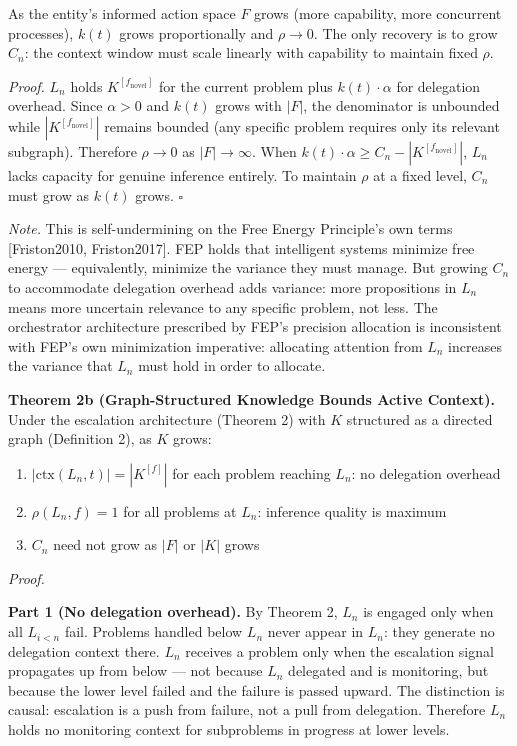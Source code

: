 \documentclass[
]{article}
\providecommand{\tightlist}{%
  \setlength{\itemsep}{0pt}\setlength{\parskip}{0pt}}
\begin{document}
As the entity's informed action space \(F\) grows (more capability, more
concurrent processes), \(k(t)\) grows proportionally and \(\rho \to 0\).
The only recovery is to grow \(C_n\): the context window must scale
linearly with capability to maintain fixed \(\rho\).

\emph{Proof.} \(L_n\) holds \(K^{[f_{\text{novel}}]}\) for the current
problem plus \(k(t)\cdot\alpha\) for delegation overhead. Since
\(\alpha > 0\) and \(k(t)\) grows with \(|F|\), the denominator is
unbounded while \(|K^{[f_{\text{novel}}]}|\) remains bounded (any
specific problem requires only its relevant subgraph). Therefore
\(\rho \to 0\) as \(|F| \to \infty\). When
\(k(t)\cdot\alpha \geq C_n - |K^{[f_{\text{novel}}]}|\), \(L_n\) lacks
capacity for genuine inference entirely. To maintain \(\rho\) at a fixed
level, \(C_n\) must grow as \(k(t)\) grows. \(\square\)

\emph{Note.} This is self-undermining on the Free Energy Principle's own
terms {[}Friston2010, Friston2017{]}. FEP holds that intelligent systems
minimize free energy --- equivalently, minimize the variance they must
manage. But growing \(C_n\) to accommodate delegation overhead adds
variance: more propositions in \(L_n\) means more uncertain relevance to
any specific problem, not less. The orchestrator architecture prescribed
by FEP's precision allocation is inconsistent with FEP's own
minimization imperative: allocating attention from \(L_n\) increases the
variance that \(L_n\) must hold in order to allocate.

\textbf{Theorem 2b (Graph-Structured Knowledge Bounds Active Context).}
Under the escalation architecture (Theorem 2) with \(K\) structured as a
directed graph (Definition 2), as \(K\) grows:

\begin{enumerate}
\def\labelenumi{\arabic{enumi}.}
\tightlist
\item
  \(|\text{ctx}(L_n, t)| = |K^{[f]}|\) for each problem reaching
  \(L_n\): no delegation overhead
\item
  \(\rho(L_n, f) = 1\) for all problems at \(L_n\): inference quality is
  maximum
\item
  \(C_n\) need not grow as \(|F|\) or \(|K|\) grows
\end{enumerate}

\emph{Proof.}

\textbf{Part 1 (No delegation overhead).} By Theorem 2, \(L_n\) is
engaged only when all \(L_{i < n}\) fail. Problems handled below \(L_n\)
never appear in \(L_n\): they generate no delegation context there.
\(L_n\) receives a problem only when the escalation signal propagates up
from below --- not because \(L_n\) delegated and is monitoring, but
because the lower level failed and the failure is passed upward. The
distinction is causal: escalation is a push from failure, not a pull
from delegation. Therefore \(L_n\) holds no monitoring context for
subproblems in progress at lower levels.
\end{document}
